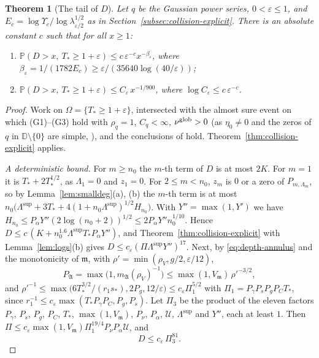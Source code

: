 \documentclass[11pt]{amsart}
\newtheorem{theorem}{Theorem}[section]
\theoremstyle{definition}
\theoremstyle{remark}
\numberwithin{equation}{section}
\newcommand{\D}{\mathbb{D}}
\newcommand{\PP}{\mathbb{P}}
\newcommand{\eps}{\varepsilon}
\begin{document}
\begin{theorem}[The tail of $D$]\label{thm:Dtail}
Let $q$ be the Gaussian power series, $0<\eps\le1$, and $E_c=\log\Upsilon_c/\log\lambda_{\eps/2}^{1/2}$ as in Section~\ref{subsec:collision-explicit}. There is an absolute constant $c$ such that for all $x\ge1$:
\begin{enumerate}
\item[(a)] $\PP(D>x,\ T_*\ge1+\eps)\le c\,\eps^{-c}x^{-\beta_\eps}$, where $\beta_\eps=1/(1782E_c)\ge\eps/(35640\log(40/\eps))$;
\item[(b)] $\PP(D>x,\ T_*\ge1+\eps)\le C_\eps\,x^{-1/900}$, where $\log C_\eps\le c\,\eps^{-c}$.
\end{enumerate}
\end{theorem}

\begin{proof}
Work on $\Omega=\{T_*\ge1+\eps\}$, intersected with the almost sure event on which (G1)--(G3) hold with $\rho_q=1$, $C_q<\infty$, $\nu^{\rm glob}>0$ (as $\eta_0\ne0$ and the zeros of $q$ in $\D\setminus\{0\}$ are simple, \cite[Lemma~\ref{M-lem:resample}]{Main}), and the conclusions of \cite[Corollary~\ref{M-cor:collision-gauss}]{Main} hold. Theorem~\ref{thm:collision-explicit} applies.

\emph{A deterministic bound.} For $m\ge n_0$ the $m$-th term of $D$ is at most $2K$. For $m=1$ it is $T_*+2T_*^{1/2}$, as $\Lambda_1=0$ and $z_1=0$. For $2\le m<n_0$, $z_m$ is $0$ or a zero of $P_{m,\Lambda_m}$, so by Lemma~\ref{lem:smalldeg}(a), (b) the $m$-th term is at most $n_0\bigl(\Lambda^{\sup}+3T_*+4(1+n_0\Lambda^{\sup})^{1/2}H_{n_0}\bigr)$. With $Y''=\max(1,Y')$ we have $H_{n_0}\le P_\alpha Y''(2\log(n_0+2))^{1/2}\le2P_\alpha Y''n_0^{1/10}$. Hence $D\le c\,(K+n_0^{1.6}\Lambda^{\sup}T_*P_\alpha Y'')$, and Theorem~\ref{thm:collision-explicit} with Lemma~\ref{lem:logs}(b) gives $D\le c_\eps(\Pi\Lambda^{\sup}Y'')^{17}$. Next, by \eqref{eq:depth-annulus} and the monotonicity of $\mathfrak m$, with $\rho'=\min(\rho_V,g/2,\eps/12)$,
\[
P_{\mathfrak A}=\max\bigl(1,m_{\mathfrak A}(\rho_V)^{-1}\bigr)\le\max(1,V_{\mathfrak m})\,\rho'^{-3/2},
\]
and $\rho'^{-1}\le\max\bigl(6T_*^{3/2}/(r_1s_*),2P_g,12/\eps\bigr)\le c_\eps\Pi_1^{5/2}$ with $\Pi_1=P_\gamma P_sP_gP_CT_*$, since $r_1^{-1}\le c_\eps\max(T_*P_\gamma P_C,P_g,P_s)$. Let $\Pi_3$ be the product of the eleven factors $P_\gamma$, $P_s$, $P_g$, $P_C$, $T_*$, $\max(1,V_{\mathfrak m})$, $P_\nu$, $P_\alpha$, $\mathcal U$, $\Lambda^{\sup}$ and $Y''$, each at least $1$. Then $\Pi\le c_\eps\max(1,V_{\mathfrak m})\Pi_1^{19/4}P_\nu P_\alpha\mathcal U$, and
\begin{equation}\label{eq:Dpoly}
D\le c_\eps\,\Pi_3^{81}.
\end{equation}


\end{proof}
\end{document}
